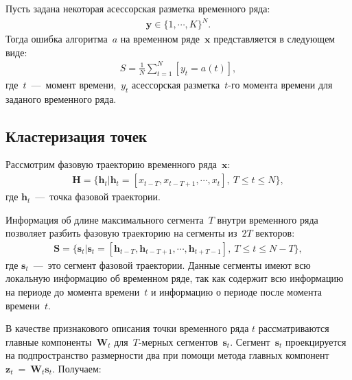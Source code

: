Пусть задана некоторая асессорская разметка временного ряда:
\begin{equation}
\label{eq:st:6}
\begin{aligned}
\textbf{y} \in \{1,\cdots,K\}^{N}.
\end{aligned}
\end{equation}
Тогда ошибка алгоритма~$a$ на временном ряде~$\textbf{x}$ представляется в следующем виде:
\begin{equation}
\label{eq:st:7}
\begin{aligned}
S = \frac{1}{N}\sum_{t=1}^{N}[y_t = a\left(t\right)],
\end{aligned}
\end{equation}
где~$t$~---~момент времени,~$y_t$ асессорская разметка~$t$-го момента времени для заданого временного ряда.


\subsection{Кластеризация точек}
Рассмотрим фазовую траекторию временного ряда~$\textbf{x}$:
\begin{equation}
\label{eq:cl:1}
\begin{aligned}
\mathbf{H} = \{\textbf{h}_t| \textbf{h}_t = [x_{t-T}, x_{t-T+1}, \cdots, x_{t}],~T\leq t\leq N\},
\end{aligned}
\end{equation}
где $\textbf{h}_t$~---~точка фазовой траектории.

Информация об длине максимального сегмента~$T$ внутри временного ряда позволяет разбить фазовую траекторию на сегменты из~$2T$ векторов:
\begin{equation}
\label{eq:cl:2}
\begin{aligned}
\mathbf{S} = \{\textbf{s}_t| \textbf{s}_t = [\textbf{h}_{t-T}, \textbf{h}_{t-T+1}, \cdots, \textbf{h}_{t+T-1}],~T\leq t\leq N-T\},
\end{aligned}
\end{equation}
где $\textbf{s}_t$~---~это сегмент фазовой траектории. Данные сегменты имеют всю локальную информацию об временном ряде, так как содержит всю информацию на периоде до момента времени~$t$ и информацию о периоде после момента времени~$t$.

В качестве признакового описания точки временного ряда $t$ рассматриваются главные компоненты~$\textbf{W}_t$ для~$T\text{-мерных}$ сегментов~$\textbf{s}_t$. Сегмент~$\textbf{s}_t$ проекцируется на подпространство размерности два при помощи метода главных  компонент~$\textbf{z}_t~=~\textbf{W}_t\textbf{s}_t$. Получаем:

